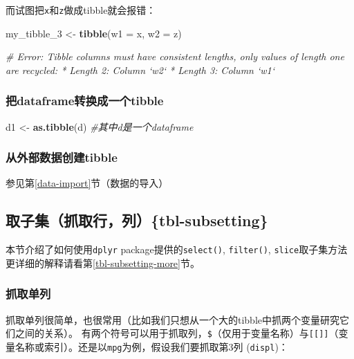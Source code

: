 \documentclass[]{book}
\newenvironment{Shaded}{\begin{snugshade}}{\end{snugshade}}
\newcommand{\CommentTok}[1]{\textcolor[rgb]{0.56,0.35,0.01}{\textit{#1}}}
\newcommand{\DataTypeTok}[1]{\textcolor[rgb]{0.13,0.29,0.53}{#1}}
\newcommand{\DecValTok}[1]{\textcolor[rgb]{0.00,0.00,0.81}{#1}}
\newcommand{\KeywordTok}[1]{\textcolor[rgb]{0.13,0.29,0.53}{\textbf{#1}}}
\newcommand{\NormalTok}[1]{#1}
\newcommand{\StringTok}[1]{\textcolor[rgb]{0.31,0.60,0.02}{#1}}
\begin{document}
而试图把\texttt{x}和\texttt{z}做成tibble就会报错：

\begin{Shaded}
\begin{Highlighting}[]
\NormalTok{my_tibble_}\DecValTok{3}\NormalTok{ <-}\StringTok{ }\KeywordTok{tibble}\NormalTok{(}\DataTypeTok{w1 =}\NormalTok{ x, }\DataTypeTok{w2 =}\NormalTok{ z)}

 \CommentTok{# Error: Tibble columns must have consistent lengths, only values of length one are recycled: * Length 2: Column `w2` * Length 3: Column `w1`}
\end{Highlighting}
\end{Shaded}

\hypertarget{tibble-create-from-df}{%
\subsubsection{把dataframe转换成一个tibble}\label{tibble-create-from-df}}

\begin{Shaded}
\begin{Highlighting}[]
\NormalTok{d1 <-}\StringTok{ }\KeywordTok{as.tibble}\NormalTok{(d) }\CommentTok{#其中d是一个dataframe}
\end{Highlighting}
\end{Shaded}

\hypertarget{tibble-import}{%
\subsubsection{从外部数据创建tibble}\label{tibble-import}}

参见第\ref{data-import}节（数据的导入）

\hypertarget{tbl-subsetting}{%
\subsection{取子集（抓取行，列）\{tbl-subsetting\}}\label{tbl-subsetting}}

本节介绍了如何使用\texttt{dplyr} package提供的\texttt{select()}, \texttt{filter()}, \texttt{slice}取子集方法
更详细的解释请看第\ref{tbl-subsetting-more}节。

\hypertarget{single-column}{%
\subsubsection{抓取单列}\label{single-column}}

抓取单列很简单，也很常用（比如我们只想从一个大的tibble中抓两个变量研究它们之间的关系）。 有两个符号可以用于抓取列，\texttt{\$}（仅用于变量名称）与\texttt{{[}{[}{]}{]}}（变量名称或索引）。还是以\texttt{mpg}为例，假设我们要抓取第3列 (\texttt{displ})：
\end{document}
